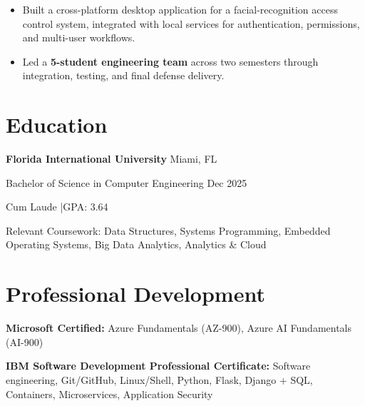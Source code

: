 \documentclass[10pt]{article}
\newcommand{\sep}{\;|\;}
\begin{document}
\begin{itemize}
\item Built a cross-platform desktop application for a facial-recognition access control system, integrated with local services for authentication, permissions, and multi-user workflows.
\item Led a \textbf{5-student engineering team} across two semesters through integration, testing, and final defense delivery.
\end{itemize}
\section{Education}

\textbf{Florida International University} \hfill Miami, FL

Bachelor of Science in Computer Engineering \hfill Dec 2025

Cum Laude \sep GPA: 3.64

Relevant Coursework: Data Structures, Systems Programming, Embedded Operating Systems, Big Data Analytics, Analytics \& Cloud

\section{Professional Development}

\textbf{Microsoft Certified:} Azure Fundamentals (AZ-900), Azure AI Fundamentals (AI-900)

\textbf{IBM Software Development Professional Certificate:} Software engineering, Git/GitHub, Linux/Shell, Python, Flask, Django + SQL, Containers, Microservices, Application Security
\end{document}
